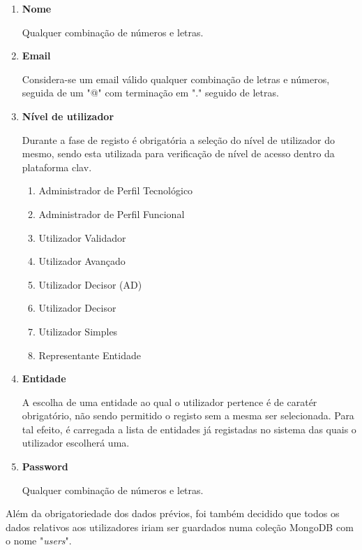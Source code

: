\begin{enumerate}
    \item \textbf{Nome}
    
        Qualquer combinação de números e letras.
    \item \textbf{Email}
    
        Considera-se um email válido qualquer combinação de letras e números, seguida de um "@" com terminação em "." seguido de letras.
    \item \textbf{Nível de utilizador}
    
        Durante a fase de registo é obrigatória a seleção do nível de utilizador do mesmo, sendo esta utilizada para verificação de nível de acesso dentro da plataforma \gls{clav}.
    \begin{enumerate}
        \item Administrador de Perfil Tecnológico
        \item Administrador de Perfil Funcional
        \item Utilizador Validador
        \item Utilizador Avançado
        \item Utilizador Decisor (AD)
        \item Utilizador Decisor
        \item Utilizador Simples
        \item Representante Entidade
    \end{enumerate}
    \item \textbf{Entidade}
    
        A escolha de uma entidade ao qual o utilizador pertence é de caratér obrigatório, não sendo permitido o registo sem a mesma ser selecionada. Para tal efeito, é carregada a lista de entidades já registadas no sistema das quais o utilizador escolherá uma.
        
    \item \textbf{Password}
    
        Qualquer combinação de números e letras.
\end{enumerate}

Além da obrigatoriedade dos dados prévios, foi também decidido que todos os dados relativos aos utilizadores iriam ser guardados numa coleção MongoDB com o nome "\emph{users}".

